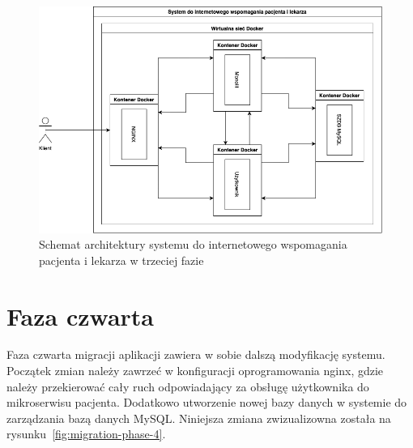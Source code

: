 \documentclass[12pt,oneside]{book}
\newcommand{\captionvspace}{\vspace{6pt}}
\begin{document}
    \begin{figure}[ht]
        \centering
        \includegraphics[width=\textwidth]{includes/images/migration-phase-3.png}
        \captionvspace
        \caption{Schemat architektury systemu do internetowego wspomagania pacjenta i lekarza w trzeciej fazie}
        \label{fig:migration-phase-3}
    \end{figure}


    \section{Faza czwarta}
    Faza czwarta migracji aplikacji zawiera w sobie dalszą modyfikację systemu. Początek zmian należy zawrzeć w konfiguracji oprogramowania nginx, gdzie należy przekierować cały ruch odpowiadający za obsługę użytkownika do mikroserwisu pacjenta. Dodatkowo utworzenie nowej bazy danych w systemie do zarządzania bazą danych MySQL. Niniejsza zmiana zwizualizowna została na rysunku~\ref{fig:migration-phase-4}.
\end{document}
